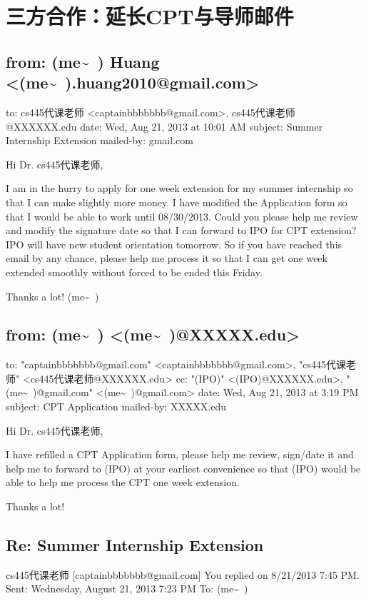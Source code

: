 \documentclass[12pt]{book}
\begin{document}
\chapter{三方合作：延长CPT与导师邮件}
\label{sec-36}

\section{from:         (me\textasciitilde{}~) Huang <(me\textasciitilde{}~).huang2010@gmail.com>}
\label{sec-36-1}
to:         cs445代课老师 <captainbbbbbbb@gmail.com>,
 cs445代课老师@XXXXXX.edu
date:         Wed, Aug 21, 2013 at 10:01 AM
subject:         Summer Internship Extension
mailed-by:         gmail.com

Hi Dr. cs445代课老师, 

I am in the hurry to apply for one week extension for my summer internship so that I can make slightly more money. I have modified the Application form so that I would be able to work until 08/30/2013. Could you please help me review and modify the signature date so that I can forward to IPO for CPT extension? IPO will have new student orientation tomorrow. So if you have reached this email by any chance, please help me process it so that I can get one week extended smoothly without forced to be ended this Friday. 

Thanks a lot!
(me\textasciitilde{}~)


\section{from:         (me\textasciitilde{}~) <(me\textasciitilde{}~)@XXXXX.edu>}
\label{sec-36-2}
to:         "captainbbbbbbb@gmail.com" <captainbbbbbbb@gmail.com>,
 "cs445代课老师" <cs445代课老师@XXXXXX.edu>
cc:         "(IPO)" <(IPO)@XXXXXX.edu>,
 "(me\textasciitilde{}~)@gmail.com" <(me\textasciitilde{}~)@gmail.com>
date:         Wed, Aug 21, 2013 at 3:19 PM
subject:         CPT Application
mailed-by:         XXXXX.edu

Hi Dr. cs445代课老师,

I have refilled a CPT Application form, please help me review, sign/date it and help me to forward to (IPO) at your earliest convenience so that (IPO) would be able to help me process the CPT one week extension.

Thanks a lot!


\section{Re: Summer Internship Extension}
\label{sec-36-3}
cs445代课老师 [captainbbbbbbb@gmail.com]
You replied on 8/21/2013 7:45 PM.
Sent:        Wednesday, August 21, 2013 7:23 PM
To:         (me\textasciitilde{}~)        
\end{document}
